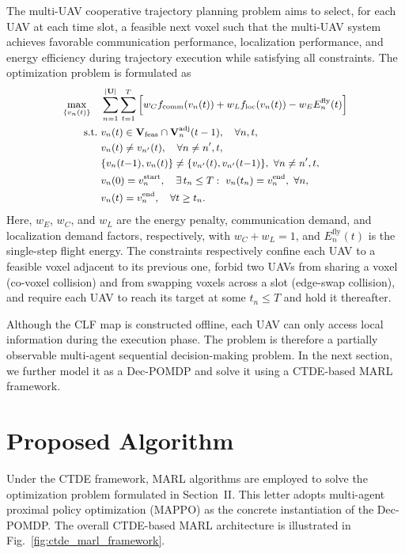 \documentclass[lettersize,journal]{IEEEtran}
\begin{document}
The multi-UAV cooperative trajectory planning problem aims to select, for each UAV at each time slot, a feasible next voxel such that the multi-UAV system achieves favorable communication performance, localization performance, and energy efficiency during trajectory execution while satisfying all constraints. The optimization problem is formulated as
\begin{equation}
\small
\begin{aligned}
\max_{\{v_n(t)\}}\quad
& \sum_{n=1}^{|\mathbf{U}|}\sum_{t=1}^{T}
\Big[
w_C f_{\mathrm{comm}}(v_n(t))
+ w_L f_{\mathrm{loc}}(v_n(t))
- w_E E_n^{\mathrm{fly}}(t)
\Big] \\
\mathrm{s.t.}\
& v_n(t)\in
\mathbf{V}_{\mathrm{feas}}\cap
\mathbf{V}_n^{\mathrm{adj}}(t-1),
\quad \forall n,t,\\
& v_n(t)\neq v_{n'}(t),
\quad \forall n\neq n',t,\\
& \{v_n(t{-}1),v_n(t)\}\neq\{v_{n'}(t),v_{n'}(t{-}1)\},\ \forall n\neq n',t,\\
& v_n(0)=v_n^{\mathrm{start}},\quad
\exists\,t_n\le T:\ v_n(t_n)=v_n^{\mathrm{end}},\ \forall n,\\
& v_n(t)=v_n^{\mathrm{end}},\quad \forall t\ge t_n .
\end{aligned}
\end{equation}
Here, $w_E$, $w_C$, and $w_L$ are the energy penalty, communication demand, and localization demand factors, respectively, with $w_C+w_L=1$, and $E_n^{\mathrm{fly}}(t)$ is the single-step flight energy. The constraints respectively confine each UAV to a feasible voxel adjacent to its previous one, forbid two UAVs from sharing a voxel (co-voxel collision) and from swapping voxels across a slot (edge-swap collision), and require each UAV to reach its target at some $t_n\le T$ and hold it thereafter.

Although the CLF map is constructed offline, each UAV can only access local information during the execution phase. The problem is therefore a partially observable multi-agent sequential decision-making problem. In the next section, we further model it as a Dec-POMDP and solve it using a CTDE-based MARL framework.

\section{Proposed Algorithm}

Under the CTDE framework, MARL algorithms are employed to solve the optimization problem formulated in Section~II. This letter adopts multi-agent proximal policy optimization (MAPPO) as the concrete instantiation of the Dec-POMDP. The overall CTDE-based MARL architecture is illustrated in Fig.~\ref{fig:ctde_marl_framework}.
\end{document}
